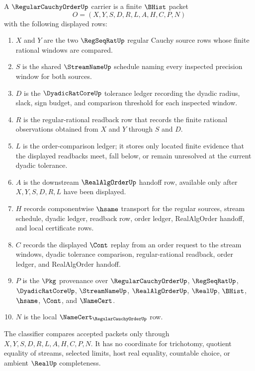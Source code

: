 \begin{definition}
\label{def:regular-cauchy-order-carrier}
A $\RegularCauchyOrderUp$ carrier is a finite $\BHist$ packet
$$
O=(X,Y,S,D,R,L,A,H,C,P,N)
$$
with the following displayed rows:
\begin{enumerate}
\item $X$ and $Y$ are the two $\RegSeqRatUp$ regular Cauchy source rows whose finite rational windows are compared.
\item $S$ is the shared $\StreamNameUp$ schedule naming every inspected precision window for both sources.
\item $D$ is the $\DyadicRatCoreUp$ tolerance ledger recording the dyadic radius, slack, sign budget, and comparison threshold for each inspected window.
\item $R$ is the regular-rational readback row that records the finite rational observations obtained from $X$ and $Y$ through $S$ and $D$.
\item $L$ is the order-comparison ledger; it stores only located finite evidence that the displayed readbacks meet, fall below, or remain unresolved at the current dyadic tolerance.
\item $A$ is the downstream $\RealAlgOrderUp$ handoff row, available only after $X,Y,S,D,R,L$ have been displayed.
\item $H$ records componentwise $\hsame$ transport for the regular sources, stream schedule, dyadic ledger, readback row, order ledger, RealAlgOrder handoff, and local certificate rows.
\item $C$ records the displayed $\Cont$ replay from an order request to the stream windows, dyadic tolerance comparison, regular-rational readback, order ledger, and RealAlgOrder handoff.
\item $P$ is the $\Pkg$ provenance over $\RegularCauchyOrderUp$, $\RegSeqRatUp$, $\DyadicRatCoreUp$, $\StreamNameUp$, $\RealAlgOrderUp$, $\RealUp$, $\BHist$, $\hsame$, $\Cont$, and $\NameCert$.
\item $N$ is the local $\NameCert_{\RegularCauchyOrderUp}$ row.
\end{enumerate}
The classifier compares accepted packets only through $X,Y,S,D,R,L,A,H,C,P,N$. It has no coordinate for trichotomy, quotient equality of streams, selected limits, host real equality, countable choice, or ambient $\RealUp$ completeness.
\end{definition}


